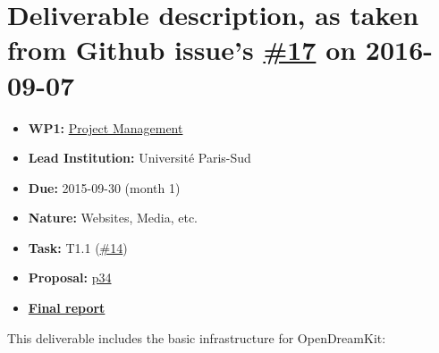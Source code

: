 \section*{\texorpdfstring{Deliverable description, as taken from Github
issue's
\href{https://github.com/OpenDreamKit/OpenDreamKit/issues/17}{\#17} on
2016-09-07}{Deliverable description, as taken from Github issue's \#17 on 2016-09-07}}\label{deliverable-description-as-taken-from-github-issues-17-on-2016-09-07}

\begin{itemize}
\tightlist
\item
  \textbf{WP1:}
  \href{https://github.com/OpenDreamKit/OpenDreamKit/tree/master/WP1}{Project
  Management}
\item
  \textbf{Lead Institution:} Université Paris-Sud
\item
  \textbf{Due:} 2015-09-30 (month 1)
\item
  \textbf{Nature:} Websites, Media, etc.
\item
  \textbf{Task:} T1.1
  (\href{https://github.com/OpenDreamKit/OpenDreamKit/issues/14}{\#14})
\item
  \textbf{Proposal:}
  \href{https://github.com/OpenDreamKit/OpenDreamKit/raw/master/Proposal/proposal-www.pdf}{p34}
\item
  \textbf{\href{https://github.com/OpenDreamKit/OpenDreamKit/raw/master/WP1/D1.1/report-final.pdf}{Final
  report}}
\end{itemize}

This deliverable includes the basic infrastructure for OpenDreamKit:

